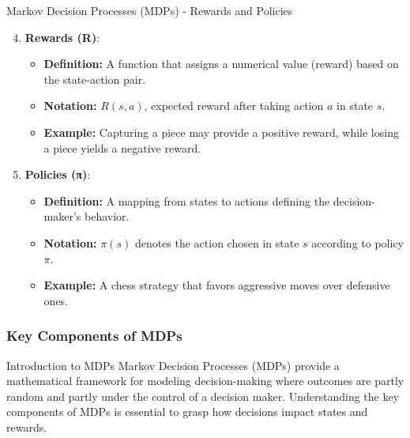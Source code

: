 \documentclass[aspectratio=169]{beamer}
\begin{document}
\begin{frame}[fragile]{Markov Decision Processes (MDPs) - Rewards and Policies}
    \begin{enumerate}
        \setcounter{enumi}{3}
        \item \textbf{Rewards (R)}:
            \begin{itemize}
                \item \textbf{Definition:} A function that assigns a numerical value (reward) based on the state-action pair.
                \item \textbf{Notation:} \( R(s, a) \), expected reward after taking action \( a \) in state \( s \).
                \item \textbf{Example:} Capturing a piece may provide a positive reward, while losing a piece yields a negative reward.
            \end{itemize}

        \item \textbf{Policies (π)}:
            \begin{itemize}
                \item \textbf{Definition:} A mapping from states to actions defining the decision-maker's behavior.
                \item \textbf{Notation:} \( π(s) \) denotes the action chosen in state \( s \) according to policy \( π \).
                \item \textbf{Example:} A chess strategy that favors aggressive moves over defensive ones.
            \end{itemize}
    \end{enumerate}
\end{frame}

\begin{frame}
  \frametitle{Key Components of MDPs}
  \begin{block}{Introduction to MDPs}
    Markov Decision Processes (MDPs) provide a mathematical framework for modeling decision-making where outcomes are partly random and partly under the control of a decision maker. Understanding the key components of MDPs is essential to grasp how decisions impact states and rewards.
  \end{block}
\end{frame}
\end{document}
